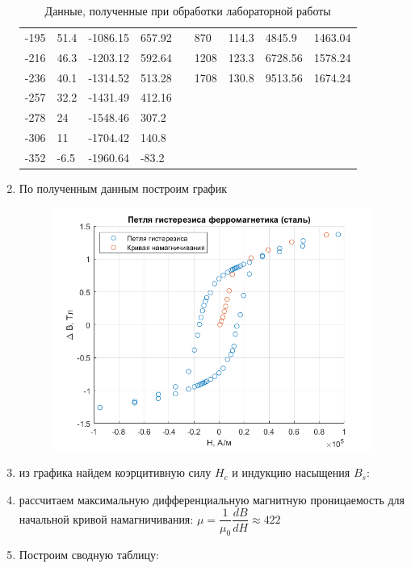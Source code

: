 \documentclass[a4paper,12pt]{article}
\begin{document}
\begin{enumerate}
\begin{table}[h!]
\begin{tabular}{|l|l|l|l||l||l|l|l|l|}
-195   & 51.4           & -1086.15  & 657.92         &  & 870   & 114.3 & 4845.9   & 1463.04 \\
-216   & 46.3           & -1203.12  & 592.64         &  & 1208  & 123.3 & 6728.56  & 1578.24 \\
-236   & 40.1           & -1314.52  & 513.28         &  & 1708  & 130.8 & 9513.56  & 1674.24 \\
-257   & 32.2           & -1431.49  & 412.16         &  &       &       &          &         \\
-278   & 24             & -1548.46  & 307.2          &  &       &       &          &         \\
-306   & 11             & -1704.42  & 140.8          &  &       &       &          &         \\
-352   & -6.5           & -1960.64  & -83.2          &  &       &       &          &   \\
\hline      
\end{tabular}
\caption{Данные, полученные при обработки лабораторной работы}
\end{table}

\item По полученным данным построим график 
\begin{figure}[h!]
\centering
\includegraphics[scale=0.6]{plot.png}
\end{figure}
\item из графика найдем коэрцитивную силу $H_{c}$ и индукцию насыщения $B_{s}$:
\item рассчитаем максимальную дифференциальную магнитную проницаемость для начальной кривой намагничивания:
$\mu =\dfrac{1}{\mu_0} \dfrac{dB}{dH}\approx 422$ 
\item Построим сводную таблицу:


\end{enumerate}
\end{document}

